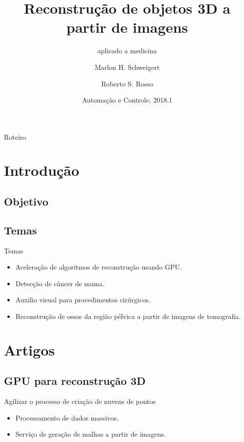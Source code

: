 \documentclass{beamer}
\title{Reconstrução de objetos 3D a partir de imagens}
\subtitle{aplicado a medicina}
\author{Marlon H. Schweigert\inst{1} \and Roberto S. Rosso\inst{1}}
\institute[UDESC] %
{
  \inst{1}%
  UDESC\\
  Universidade do Estado de Santa Catarina
}
\date{Automação e Controle, 2018.1}
\begin{document}
\begin{frame}
  \titlepage
\end{frame}

\begin{frame}{Roteiro}
  \tableofcontents
\end{frame}

\section{Introdução}

\subsection{Objetivo}
\subsection{Temas}

\begin{frame}{Temas}{}
  \begin{itemize}
  \item {
    Aceleração de algoritmos de reconstrução usando GPU.
  }
  \item {
    Detecção de câncer de mama.
  }
  \item {
    Auxilio visual para procedimentos cirúrgicos.
  }
  \item {
    Reconstrução de ossos da região pélvica a partir de imagens de tomografia.
  }
  \end{itemize}
\end{frame}

\section{Artigos}

\subsection{GPU para reconstrução 3D}

\begin{frame}{Agilizar o processo de criação de nuvens de pontos}
  \begin{itemize}
  \item {
    Processamento de dados massivos.
  }
  \item {
    Serviço de geração de malhas a partir de imagens.
  }
  \end{itemize}
\end{frame}
\end{document}
